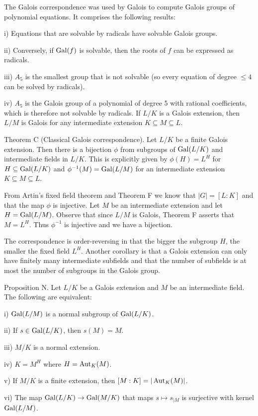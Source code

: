 The Galois correspondence was used by Galois to compute Galois groups of polynomial equations. It comprises the following results:
\medskip
\item{i)} Equations that are solvable by radicals have solvable Galois groups.
\smallskip
\item{ii)} Conversely, if $\mathop {\rm Gal}(f)$ is solvable, then the roots of $f$ can be expressed as radicals.
\smallskip
\item{iii)} $A_5$ is the smallest group that is not solvable (so every equation of degree $\leq 4$ can be solved by radicals).
\smallskip
\item{iv)} $A_5$ is the Galois group of a polynomial of degree 5 with rational coefficients, which is therefore not solvable by radicals.
\medskip
If $L/K$ is a Galois extension, then $L/M$ is Galois for any intermediate extension $K\subseteq M\subseteq L$.

\parenproclaim Theorem C (Classical Galois correspondence). Let $L/K$ be a finite Galois extension. Then there is a bijection $\phi$ from subgroups of $\mathop {\rm Gal}(L/K)$ and intermediate fields in $L/K$. This is explicitly given by $\phi(H) = L^H$ for $H\subseteq \mathop {\rm Gal}(L/K)$ and $\phi^{-1}(M) = \mathop {\rm Gal}(L/M)$ for an intermediate extension $K\subseteq M\subseteq L$.

\proof From Artin's fixed field theorem and Theorem F we know that $|G| = [L:K]$ and that the map $\phi$ is injective. Let $M$ be an intermediate extension and let $H = \mathop {\rm Gal}(L/M)$. Observe that since $L/M$ is Galois, Theorem F asserts that $M = L^H$. Thus $\phi^{-1}$ is injective and we have a bijection.\slug

The correspondence is order-reversing in that the bigger the subgroup $H$, the smaller the fixed field $L^H$. Another corollary is that a Galois extension can only have finitely many intermediate subfields and that the number of subfields is at most the number of subgroups in the Galois group.

\proclaim Proposition N. Let $L/K$ be a Galois extension and $M$ be an intermediate field. The following are equivalent:
\medskip
\item{i)} $\mathop {\rm Gal}(L/M)$ is a normal subgroup of $\mathop {\rm Gal}(L/K)$.
\smallskip
\item{ii)} If $s\in \mathop {\rm Gal}(L/K)$, then $s(M) = M$.
\smallskip
\item{iii)} $M/K$ is a normal extension.
\smallskip
\item{iv)} $K = M^H$ where $H = \mathop {\rm Aut}_K(M)$.
\smallskip
\item{v)} If $M/K$ is a finite extension, then $[M:K] = |\mathop {\rm Aut}_K(M)|$.
\smallskip
\item{vi)} The map $\mathop {\rm Gal}(L/K)\to \mathop {\rm Gal}(M/K)$ that maps $s\mapsto s_{|M}$ is surjective with kernel $\mathop {\rm Gal}(L/M)$.\noskipslug
\medskip

